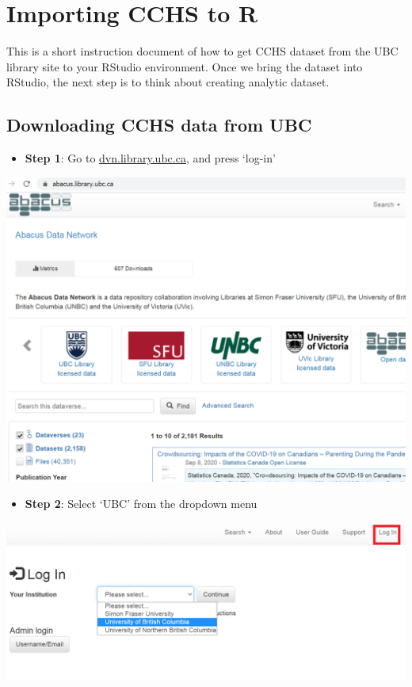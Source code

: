 \documentclass[
]{book}
\providecommand{\tightlist}{%
  \setlength{\itemsep}{0pt}\setlength{\parskip}{0pt}}
\begin{document}
\hypertarget{importing-cchs-to-r}{%
\chapter{Importing CCHS to R}\label{importing-cchs-to-r}}

This is a short instruction document of how to get CCHS dataset from the UBC library site to your RStudio environment. Once we bring the dataset into RStudio, the next step is to think about creating analytic dataset.

\hypertarget{downloading-cchs-data-from-ubc}{%
\section{Downloading CCHS data from UBC}\label{downloading-cchs-data-from-ubc}}

\begin{itemize}
\tightlist
\item
  \textbf{Step 1}: Go to \href{http://dvn.library.ubc.ca}{dvn.library.ubc.ca}, and press `log-in'
\end{itemize}

\includegraphics[width=0.65\linewidth]{images/abacusX1}

\begin{itemize}
\tightlist
\item
  \textbf{Step 2}: Select `UBC' from the dropdown menu
\end{itemize}

\includegraphics[width=0.65\linewidth]{images/abacusX2}
\end{document}
